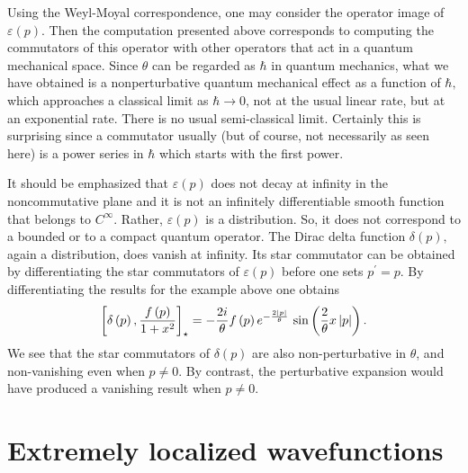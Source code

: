 \documentclass[a4paper,12pt]{article}
\begin{document}
Using the Weyl-Moyal correspondence, one may consider the operator image of $%
\varepsilon \left( p\right) .$ Then the computation presented above
corresponds to computing the commutators of this operator with other
operators that act in a quantum mechanical space. Since $\theta $ can be
regarded as $\hbar $ in quantum mechanics, what we have obtained is a
nonperturbative quantum mechanical effect as a function of $\hbar ,$ which
approaches a classical limit as $\hbar \rightarrow 0$, not at the usual
linear rate, but at an exponential rate$.$ There is no usual semi-classical
limit. Certainly this is surprising since a commutator usually (but of
course, not necessarily as seen here) is a power series in $\hbar $ which
starts with the first power$.$

It should be emphasized that $\varepsilon \left( p\right) $ does not decay
at infinity in the noncommutative plane and it is not an infinitely
differentiable smooth function that belongs to $C^{\infty }$. Rather, $%
\varepsilon \left( p\right) $ is a distribution. So, it does not correspond
to a bounded or to a compact quantum operator. The Dirac delta function $%
\delta \left( p\right) ,$ again a distribution, does vanish at infinity. Its
star commutator can be obtained by differentiating the star commutators of $%
\varepsilon \left( p\right) $ before one sets $p^{\prime }=p.$ By
differentiating the results for the example above one obtains
\begin{equation*}
\left[ \delta \left( p\right) ,\frac{f\left( p\right) }{1+x^{2}}\right]
_{\star }=-\frac{2i}{\theta }f\left( p\right) e^{-\frac{2\left| p\right| }{%
\theta }}\,\sin \left( \frac{2}{\theta }x\left| p\right| \right) .
\end{equation*}
We see that the star commutators of $\delta \left( p\right) $ are also
non-perturbative in $\theta $, and non-vanishing even when $p\neq 0.$ By
contrast, the perturbative expansion would have produced a vanishing result
when $p\neq 0.$

\section{Extremely localized wavefunctions}
\end{document}
